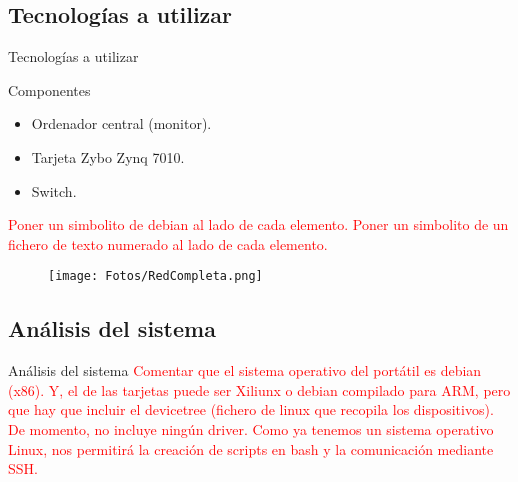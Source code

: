 \documentclass[aspectratio=169]{beamer}
\begin{document}
\subsection{Tecnologías a utilizar}
\begin{frame}{Tecnologías a utilizar}
\begin{block}{Componentes}
	\begin{itemize}
		\item Ordenador central (monitor).
		\item Tarjeta Zybo Zynq 7010.
		\item Switch.
	\end{itemize}
\end{block}
\textcolor{red}{Poner un simbolito de debian al lado de cada elemento. Poner un simbolito de un fichero de texto numerado al lado de cada elemento.}
\begin{figure}[h]
\centering
\texttt{[image: Fotos/RedCompleta.png]}
\end{figure}
\end{frame}

\subsection{Análisis del sistema}

\begin{frame}{Análisis del sistema}
	\textcolor{red}{Comentar que el sistema operativo del portátil es debian (x86). Y, el de las tarjetas puede ser Xiliunx o debian compilado para ARM, pero que hay que incluir el devicetree (fichero de linux que recopila los dispositivos). De momento, no incluye ningún driver. Como ya tenemos un sistema operativo Linux, nos permitirá la creación de scripts en bash y la comunicación mediante SSH.}
\end{frame}
\end{document}
